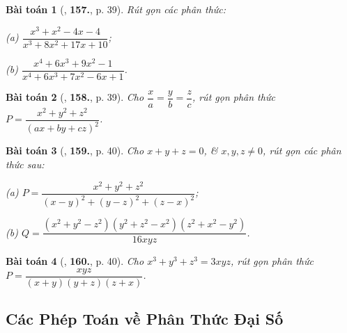 \documentclass{article}
\numberwithin{equation}{section}
\newtheorem{baitoan}{Bài toán}[section]
\begin{document}
\begin{baitoan}[\cite{Tuyen_Toan_8}, \textbf{157.}, p. 39]
	Rút gọn các phân thức:
	\begin{enumerate*}
		\item[(a)] $\dfrac{x^3 + x^2 - 4x - 4}{x^3 + 8x^2 + 17x + 10}$;
		\item[(b)] $\dfrac{x^4 + 6x^3 + 9x^2 - 1}{x^4 + 6x^3 + 7x^2 - 6x + 1}$.
	\end{enumerate*}
\end{baitoan}

\begin{baitoan}[\cite{Tuyen_Toan_8}, \textbf{158.}, p. 39]
	Cho $\dfrac{x}{a} = \dfrac{y}{b} = \dfrac{z}{c}$, rút gọn phân thức $P = \dfrac{x^2 + y^2 + z^2}{(ax + by + cz)^2}$.
\end{baitoan}

\begin{baitoan}[\cite{Tuyen_Toan_8}, \textbf{159.}, p. 40]
	Cho $x + y + z = 0$, \& $x,y,z\ne 0$, rút gọn các phân thức sau:
	
	\begin{enumerate*}
		\item[(a)] $P = \dfrac{x^2 + y^2 + z^2}{(x - y)^2 + (y - z)^2 + (z - x)^2}$;
		\item[(b)] $Q = \dfrac{(x^2 + y^2 - z^2)(y^2 + z^2 - x^2)(z^2 + x^2 - y^2)}{16xyz}$.
	\end{enumerate*}
\end{baitoan}

\begin{baitoan}[\cite{Tuyen_Toan_8}, \textbf{160.}, p. 40]
	Cho $x^3 + y^3 + z^3 = 3xyz$, rút gọn phân thức $P = \dfrac{xyz}{(x + y)(y + z)(z + x)}$.
\end{baitoan}


\subsection{Các Phép Toán về Phân Thức Đại Số}


\printbibliography[heading=bibintoc]
	
\end{document}
